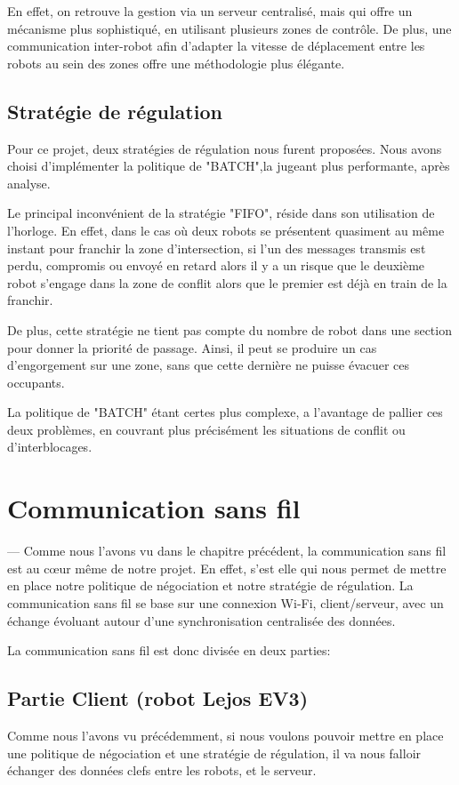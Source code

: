 \documentclass[french,a4paper,12pt]{report}
\begin{document}
En effet, on retrouve la gestion via un serveur centralisé, mais qui offre un mécanisme plus sophistiqué, en utilisant plusieurs zones de contrôle. De plus, une communication inter-robot afin d'adapter la vitesse de déplacement entre les robots au sein des zones offre une méthodologie plus élégante.

\section{Stratégie de régulation}
Pour ce projet, deux stratégies de régulation nous furent proposées.
Nous avons choisi d'implémenter la politique de "BATCH",la jugeant plus performante, après analyse.

Le principal inconvénient de la stratégie "FIFO", réside dans son utilisation de l'horloge.
En effet, dans le cas où deux robots se présentent quasiment au même instant pour franchir la zone d'intersection, si l'un des messages transmis est perdu, compromis ou envoyé en retard alors il y a un risque que le deuxième robot s'engage dans la zone de conflit alors que le premier est déjà en train de la franchir.

De plus, cette stratégie ne tient pas compte du nombre de robot dans une section pour donner la priorité de passage. Ainsi, il peut se produire un cas d'engorgement sur une zone, sans que cette dernière ne puisse évacuer ces occupants.

La politique de "BATCH" étant certes plus complexe, a l'avantage de pallier ces deux problèmes, en couvrant plus précisément les situations de conflit ou d'interblocages.

\chapter{Communication sans fil}---
Comme nous l'avons vu dans le chapitre précédent, la communication sans fil est au cœur même de notre projet. En effet, s'est elle qui nous permet de mettre en place notre politique de négociation et notre stratégie de régulation.
La communication sans fil se base sur une connexion Wi-Fi, client/serveur, avec un échange évoluant autour d'une synchronisation centralisée des données.

La communication sans fil est donc divisée en deux parties:

\section{Partie Client (robot Lejos EV3)}%
Comme nous l'avons vu précédemment, si nous voulons pouvoir mettre en place une politique de négociation et une stratégie de régulation, il va nous falloir échanger des données clefs entre les robots, et le serveur.
\end{document}
